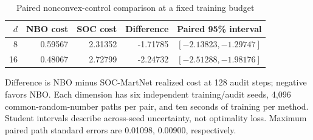 \begin{table}[htbp]
\centering\small
\caption{Paired nonconvex-control comparison at a fixed training budget}\label{r8:tab:external}
\begin{tabular}{@{}rrrrl@{}}
\toprule
$d$ & NBO cost & SOC cost & Difference & Paired 95\% interval \\
\midrule
8 & 0.59567 & 2.31352 & -1.71785 & $[-2.13823,-1.29747]$ \\
16 & 0.48067 & 2.72799 & -2.24732 & $[-2.51288,-1.98176]$ \\
\bottomrule
\end{tabular}
\par\smallskip\footnotesize Difference is NBO minus SOC-MartNet realized cost at 128 audit steps; negative favors NBO. Each dimension has six independent training/audit seeds, 4,096 common-random-number paths per pair, and ten seconds of training per method. Student intervals describe across-seed uncertainty, not optimality loss. Maximum paired path standard errors are 0.01098, 0.00900, respectively.
\end{table}
